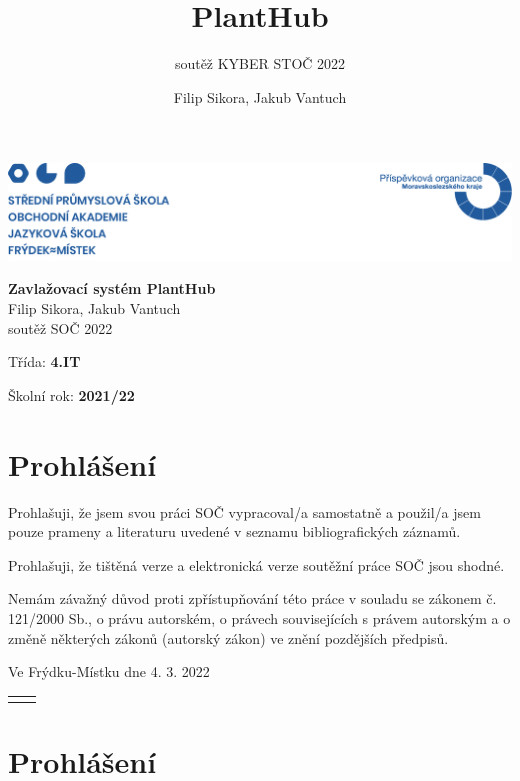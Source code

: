\documentclass[11pt,a4paper]{article}
\title{PlantHub}
\subtitle{soutěž KYBER STOČ 2022 }
\author{Filip Sikora, Jakub Vantuch}
\date{}
\begin{document}
\begin{titlepage}
	\noindent\includegraphics[width=\linewidth]{header.png}
	\vspace{4cm} \\
	\begin{center}
		\Huge\textbf{Zavlažovací systém PlantHub}
		\vspace{1cm} \\
		\LARGE Filip Sikora, Jakub Vantuch
		\vspace{1cm} \\
		\Large soutěž SOČ 2022
		\vfill
		\normalsize
		\begin{minipage}{0.7\linewidth}
			Třída: \textbf{4.IT}
		\end{minipage}%
		\begin{minipage}{0.25\linewidth}
			Školní rok: \textbf{2021/22}
		\end{minipage}
	\end{center}

\end{titlepage}

\section*{Prohlášení}

Prohlašuji, že jsem svou práci SOČ vypracoval/a samostatně a použil/a jsem
pouze prameny a literaturu uvedené v seznamu bibliografických záznamů.

Prohlašuji, že tištěná verze a elektronická verze soutěžní práce SOČ jsou
shodné.

Nemám závažný důvod proti zpřístupňování této práce v souladu se zákonem č.
121/2000 Sb., o právu autorském, o právech souvisejících s právem autorským a o
změně některých zákonů (autorský zákon) ve znění pozdějších předpisů.

Ve Frýdku-Místku dne 4. 3. 2022

\begin{tabular}{@{}p{2.5in}p{2.5in}@{}}
	 & \dotfill
\end{tabular}

\section*{Prohlášení}
\end{document}

